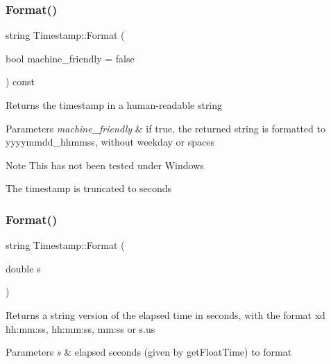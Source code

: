 \subsubsection{\texorpdfstring{Format()}{Format()}\hspace{0.1cm}{\footnotesize\ttfamily [1/2]}}
{\footnotesize\ttfamily string Timestamp\+::\+Format (\begin{DoxyParamCaption}\item[{bool}]{machine\+\_\+friendly = {\ttfamily false} }\end{DoxyParamCaption}) const}

Returns the timestamp in a human-\/readable string 
\begin{DoxyParams}{Parameters}
{\em machine\+\_\+friendly} & if true, the returned string is formatted to yyyymmdd\+\_\+hhmmss, without weekday or spaces \\
\hline
\end{DoxyParams}
\begin{DoxyNote}{Note}
This has not been tested under Windows 

The timestamp is truncated to seconds 
\end{DoxyNote}
\mbox{\label{class_d_utils_1_1_timestamp_abd63d0a2abc2209f9300296ee3e85265}} 
\subsubsection{\texorpdfstring{Format()}{Format()}\hspace{0.1cm}{\footnotesize\ttfamily [2/2]}}
{\footnotesize\ttfamily string Timestamp\+::\+Format (\begin{DoxyParamCaption}\item[{double}]{s }\end{DoxyParamCaption})\hspace{0.3cm}{\ttfamily [static]}}

Returns a string version of the elapsed time in seconds, with the format xd hh\+:mm\+:ss, hh\+:mm\+:ss, mm\+:ss or s.\+us 
\begin{DoxyParams}{Parameters}
{\em s} & elapsed seconds (given by get\+Float\+Time) to format \\
\hline
\end{DoxyParams}
\mbox{\label{class_d_utils_1_1_timestamp_a360ea9b3a339c315f1a1eb2416787088}} 
